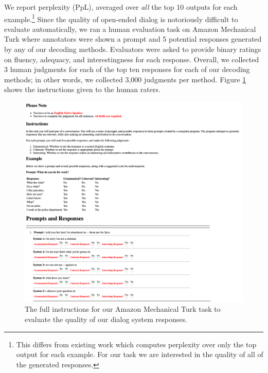 We report perplexity (PpL), averaged over \textit{all} the top 10 outputs for each example.\footnote{This differs from existing work which computes perplexity over only the top output for each example. For our task we are interested in the quality of all of the generated responses.} Since the quality of open-ended dialog is notoriously difficult to evaluate automatically, we ran a human evaluation task on Amazon Mechanical Turk where annotators were shown a prompt and 5 potential responses generated by any of our decoding methods.
Evaluators were asked to provide binary ratings on fluency, adequacy, and interestingness for each response. Overall, we collected 3 human judgments for each of the top ten responses for each of our decoding methods; in other words, we collected 3,000 judgments per method.
Figure \ref{figure:mturk_example} shows the instructions given to the human raters.

\begin{figure}
    \includegraphics[width=\textwidth]{figures/dediv_mturk_example.png}
    \caption{The full instructions for our Amazon Mechanical Turk task to evaluate the quality of our dialog system responses.}
    \label{figure:mturk_example}
\end{figure}

